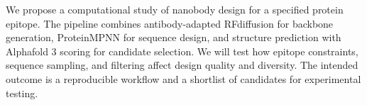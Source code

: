 We propose a computational study of nanobody design for a specified protein epitope. The pipeline combines antibody-adapted RFdiffusion for backbone generation, ProteinMPNN for sequence design, and structure prediction with Alphafold 3 scoring for candidate selection. We will test how epitope constraints, sequence sampling, and filtering affect design quality and diversity. The intended outcome is a reproducible workflow and a shortlist of candidates for experimental testing.
